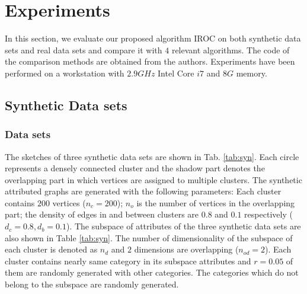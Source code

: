 \section{Experiments}
In this section, we evaluate our proposed algorithm IROC on both synthetic data sets and real data sets and compare it with $4$ relevant algorithms. The code of the comparison methods are obtained from the authors. Experiments have been performed on a workstation with $2.9GHz$ Intel Core $i7$ and $8G$ memory.

\subsection{Synthetic Data sets}
\subsubsection{Data sets}
The sketches of three synthetic data sets are shown in Tab. \ref{tab:syn}. Each circle represents a densely connected cluster and the shadow part denotes the overlapping part in which vertices are assigned to multiple clusters. The synthetic attributed graphs are generated with the following parameters: Each cluster contains $200$ vertices ($n_c = 200$); $n_o$ is the number of vertices in the overlapping part; the density of edges in and between clusters are $0.8$ and $0.1$ respectively ($d_c=0.8, d_b=0.1$). The subspace of attributes of the three synthetic data sets are also shown in Table \ref{tab:syn}. The number of dimensionality of the subspace of each cluster is denoted as $n_d$ and $2$ dimensions are overlapping ($n_{od} = 2$). Each cluster contains nearly same category in its subspace attributes and $r=0.05$ of them are randomly generated with other categories. The categories which do not belong to the subspace are randomly generated. 
